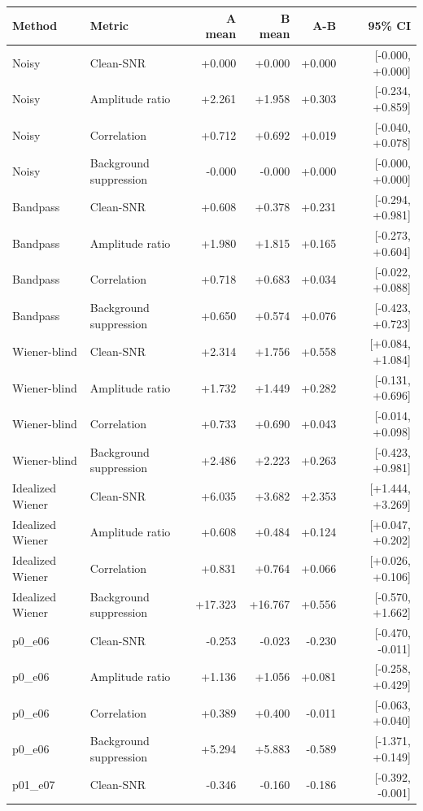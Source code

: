 \begin{tabular}{llrrrr}
\toprule
Method & Metric & A mean & B mean & A-B & 95\% CI \\
\midrule
Noisy & Clean-SNR & +0.000 & +0.000 & +0.000 & [-0.000, +0.000] \\
Noisy & Amplitude ratio & +2.261 & +1.958 & +0.303 & [-0.234, +0.859] \\
Noisy & Correlation & +0.712 & +0.692 & +0.019 & [-0.040, +0.078] \\
Noisy & Background suppression & -0.000 & -0.000 & +0.000 & [-0.000, +0.000] \\
Bandpass & Clean-SNR & +0.608 & +0.378 & +0.231 & [-0.294, +0.981] \\
Bandpass & Amplitude ratio & +1.980 & +1.815 & +0.165 & [-0.273, +0.604] \\
Bandpass & Correlation & +0.718 & +0.683 & +0.034 & [-0.022, +0.088] \\
Bandpass & Background suppression & +0.650 & +0.574 & +0.076 & [-0.423, +0.723] \\
Wiener-blind & Clean-SNR & +2.314 & +1.756 & +0.558 & [+0.084, +1.084] \\
Wiener-blind & Amplitude ratio & +1.732 & +1.449 & +0.282 & [-0.131, +0.696] \\
Wiener-blind & Correlation & +0.733 & +0.690 & +0.043 & [-0.014, +0.098] \\
Wiener-blind & Background suppression & +2.486 & +2.223 & +0.263 & [-0.423, +0.981] \\
Idealized Wiener & Clean-SNR & +6.035 & +3.682 & +2.353 & [+1.444, +3.269] \\
Idealized Wiener & Amplitude ratio & +0.608 & +0.484 & +0.124 & [+0.047, +0.202] \\
Idealized Wiener & Correlation & +0.831 & +0.764 & +0.066 & [+0.026, +0.106] \\
Idealized Wiener & Background suppression & +17.323 & +16.767 & +0.556 & [-0.570, +1.662] \\
p0_e06 & Clean-SNR & -0.253 & -0.023 & -0.230 & [-0.470, -0.011] \\
p0_e06 & Amplitude ratio & +1.136 & +1.056 & +0.081 & [-0.258, +0.429] \\
p0_e06 & Correlation & +0.389 & +0.400 & -0.011 & [-0.063, +0.040] \\
p0_e06 & Background suppression & +5.294 & +5.883 & -0.589 & [-1.371, +0.149] \\
p01_e07 & Clean-SNR & -0.346 & -0.160 & -0.186 & [-0.392, -0.001] \\

\end{tabular}
